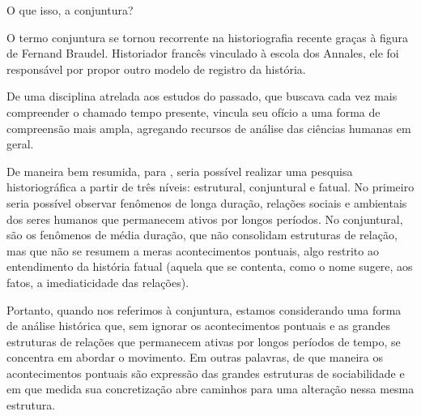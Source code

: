 \begin{knowledge}{O que isso, a conjuntura?}

O termo conjuntura se tornou recorrente na historiografia recente graças à figura de Fernand Braudel. Historiador francês vinculado à escola dos Annales, ele foi responsável por propor outro modelo de registro da  história.

De uma disciplina atrelada aos estudos do passado, que buscava cada vez mais compreender o chamado tempo presente, \citeauthor{braudel1978} vincula seu ofício a uma forma de compreensão mais ampla, agregando recursos de análise das ciências humanas em geral.

De maneira bem resumida, para \citeauthor{braudel1978}, seria possível realizar uma pesquisa historiográfica a partir de três níveis: estrutural, conjuntural e fatual. No primeiro seria possível observar fenômenos de longa duração, relações sociais e ambientais dos seres humanos que permanecem ativos por longos períodos. No conjuntural, são os fenômenos de média duração, que não consolidam estruturas de relação, mas que não se resumem a meras acontecimentos pontuais, algo restrito ao entendimento da história fatual (aquela que se contenta, como o nome sugere, aos fatos, a imediaticidade das relações).

Portanto, quando nos referimos à conjuntura, estamos considerando uma forma de análise histórica que, sem ignorar os acontecimentos pontuais e as grandes estruturas de relações que permanecem ativas por longos períodos de tempo, se concentra em abordar o movimento. Em outras palavras, de que maneira os acontecimentos pontuais são expressão das grandes estruturas de sociabilidade e em que medida sua concretização abre caminhos para uma alteração nessa mesma estrutura.

\end{knowledge}


